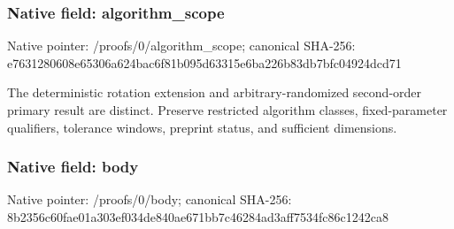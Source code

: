 \documentclass[10pt,a4paper]{article}
\begin{document}
\subsubsection{Native field: algorithm\_\allowbreak{}scope}
Native pointer: /proofs/0/algorithm\_\allowbreak{}scope; canonical SHA-256: e7631280608e65306a624bac6f81b095d63315e6ba226b83db7bfc04924dcd71

\begingroup\raggedright\sloppy The deterministic rotation extension and arbitrary-randomized second-order primary result are distinct. Preserve restricted algorithm classes,\allowbreak{} fixed-parameter qualifiers,\allowbreak{} tolerance windows,\allowbreak{} preprint status,\allowbreak{} and sufficient dimensions.\par\endgroup

\subsubsection{Native field: body}
Native pointer: /proofs/0/body; canonical SHA-256: 8b2356c60fae01a303ef034de840ae671bb7c46284ad3aff7534fc86c1242ca8
\end{document}

